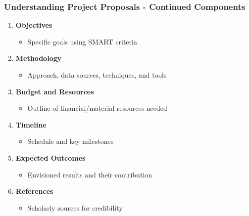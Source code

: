 \documentclass[aspectratio=169]{beamer}
\begin{document}
\begin{frame}[fragile]
  \frametitle{Understanding Project Proposals - Continued Components}
  \begin{enumerate}[resume]
    \item \textbf{Objectives}
      \begin{itemize}
        \item Specific goals using SMART criteria
      \end{itemize}

    \item \textbf{Methodology}
      \begin{itemize}
        \item Approach, data sources, techniques, and tools
      \end{itemize}

    \item \textbf{Budget and Resources}
      \begin{itemize}
        \item Outline of financial/material resources needed
      \end{itemize}

    \item \textbf{Timeline}
      \begin{itemize}
        \item Schedule and key milestones
      \end{itemize}

    \item \textbf{Expected Outcomes}
      \begin{itemize}
        \item Envisioned results and their contribution
      \end{itemize}

    \item \textbf{References}
      \begin{itemize}
        \item Scholarly sources for credibility
      \end{itemize}
  \end{enumerate}
\end{frame}
\end{document}
